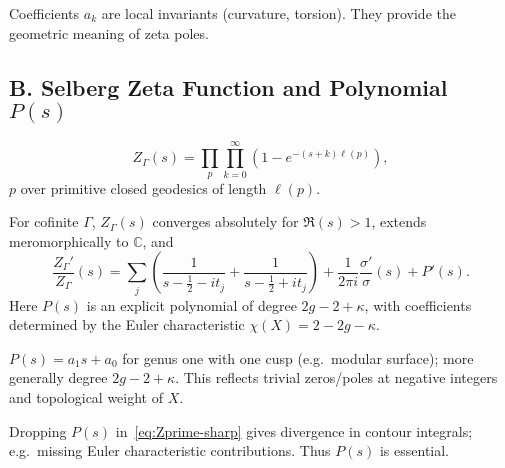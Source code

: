 \begin{remark}
Coefficients $a_k$ are local invariants (curvature, torsion). They provide the geometric meaning of zeta poles.
\end{remark}


\subsection*{B. Selberg Zeta Function and Polynomial $P(s)$}
\label{subsec:selberg-zeta-sharp}

\begin{definition}
\[
  Z_\Gamma(s) = \prod_{p}\prod_{k=0}^\infty \left(1-e^{-(s+k)\ell(p)}\right),
\]
$p$ over primitive closed geodesics of length $\ell(p)$.
\end{definition}

\begin{theorem}
\label{thm:Zprime-sharp}
For cofinite $\Gamma$, $Z_\Gamma(s)$ converges absolutely for $\Re(s)>1$, extends meromorphically to $\mathbb C$, and
\begin{equation}
\label{eq:Zprime-sharp}
  \frac{Z_\Gamma'}{Z_\Gamma}(s) 
  = \sum_j\left(\frac{1}{s-\tfrac12-it_j}+\frac{1}{s-\tfrac12+it_j}\right)
  + \frac{1}{2\pi i}\frac{\sigma'}{\sigma}(s)
  + P'(s).
\end{equation}
Here $P(s)$ is an explicit polynomial of degree $2g-2+\kappa$, with coefficients determined by the Euler characteristic $\chi(X)=2-2g-\kappa$. 
\end{theorem}

\begin{remark}[Structure of $P(s)$]
$P(s)=a_1 s+a_0$ for genus one with one cusp (e.g.\ modular surface); more generally degree $2g-2+\kappa$.  
This reflects trivial zeros/poles at negative integers and topological weight of $X$.
\end{remark}

\begin{counterexample}[If $P(s)$ ignored]
Dropping $P(s)$ in~\eqref{eq:Zprime-sharp} gives divergence in contour integrals; e.g.\ missing Euler characteristic contributions. Thus $P(s)$ is essential.
\end{counterexample}


